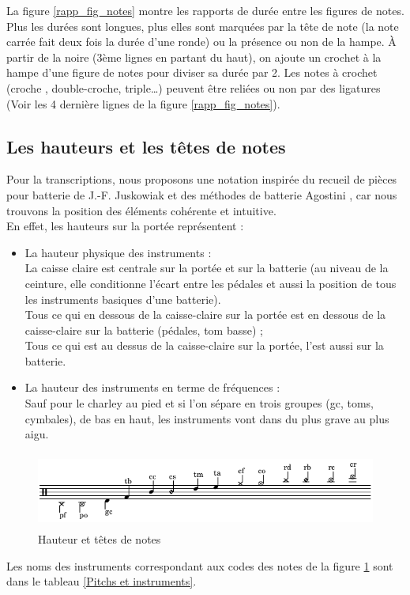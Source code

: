 La figure \ref{rapp_fig_notes} montre les rapports de durée entre les figures de notes. Plus les durées sont longues, plus elles sont marquées par la tête de note (la note carrée fait deux fois la durée d’une ronde) ou la présence ou non de la hampe. À partir de la noire (3ème lignes en partant du haut), on ajoute un crochet à la hampe d’une figure de notes pour diviser sa durée par 2. Les notes à crochet (croche , double-croche, triple…) peuvent être reliées ou non par des ligatures (Voir les 4 dernière lignes de la figure \ref{rapp_fig_notes}).
\subsection*{Les hauteurs et les têtes de notes}
Pour la transcriptions, nous proposons une notation inspirée du recueil de pièces pour batterie de J.-F. Juskowiak \cite{jusko} et des méthodes de batterie Agostini \cite{ago_meth_3}, car nous trouvons la position des éléments cohérente et intuitive.\\
En effet, les hauteurs sur la portée représentent :
\begin{itemize}
	\item La hauteur physique des instruments :\\
	La caisse claire est centrale sur la portée et sur la batterie (au niveau de la ceinture, elle conditionne l’écart entre les pédales et aussi la position de tous les instruments basiques d’une batterie).\\
	Tous ce qui en dessous de la caisse-claire sur la portée est en dessous de la caisse-claire sur la batterie (pédales, tom basse) ;\\
	Tous ce qui est au dessus de la caisse-claire sur la portée, l’est aussi sur la batterie.\\
	\item La hauteur des instruments en terme de fréquences :\\
	Sauf pour le charley au pied et si l’on sépare en trois groupes (gc, toms, cymbales), de bas en haut, les instruments vont dans du plus grave au plus aigu.
\end{itemize}
\begin{figure}[!h]
	\centering
	\includegraphics[height=25mm, width=130mm]{z_images/3_methodes/0_notation_de_la_batterie/2_hauteurs_et_tete_de_notes.png}
	\caption{Hauteur et têtes de notes}
	\label{Hauteur et têtes de notes}
\end{figure}
Les noms des instruments correspondant aux codes des notes de la figure \ref{Hauteur et têtes de notes} sont dans le tableau \ref{Pitchs et instruments}.
